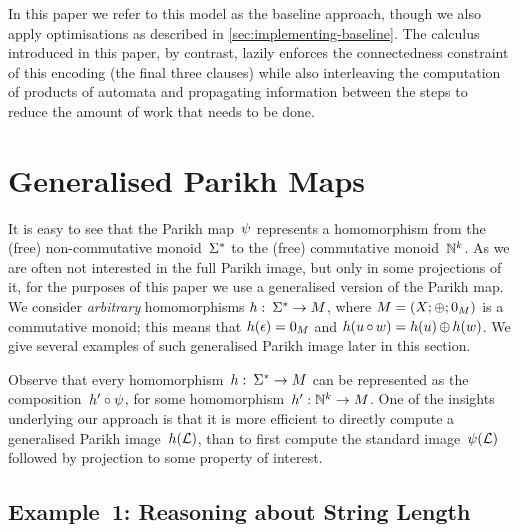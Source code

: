 \documentclass[acmsmall,review,anonymous,screen]{acmart}\settopmatter{printfolios=true,printccs=false,printacmref=true}
\theoremstyle{definition}
\begin{document}
In this paper we refer to this model as the baseline approach, though we also
apply optimisations as described in \cref{sec:implementing-baseline}. The
calculus introduced in this paper, by contrast, lazily enforces the
connectedness constraint of this encoding (the final three clauses) while also
interleaving the computation of products of automata and propagating information
between the steps to reduce the amount of work that needs to be done.
  
\section{Generalised Parikh Maps}\label{sec:generalised}

It is easy to see that the Parikh map~$\operatorname{\psi}$ represents a
homomorphism from the (free) non-commutative monoid~$\Sigma^*$ to the
(free) commutative monoid~$\mathbb{N}^k$. As we are often not
interested in the full Parikh image, but only in some projections of
it, for the purposes of this paper we use a generalised version of the
Parikh map. We consider \emph{arbitrary} homomorphisms
$h:\: \Sigma^* \to M$, where
$M = \left(X;\operatorname{\oplus};0_{M}\right)$ is a commutative
monoid; this means that $h(\epsilon) = 0_{M}$ and
$h(u \operatorname{\circ} w) = h(u) \operatorname{\oplus} h(w)$. We give several
examples of such generalised Parikh image later in this section.

Observe that every homomorphism~$h:\: \Sigma^* \to M$ can be
represented as the composition~$h' \circ \operatorname{\psi}$, for some
homomorphism~$h' : \mathbb{N}^k \to M$. One of the insights underlying our
approach is that it is more efficient to directly compute a
generalised Parikh image~$h(\operatorname{\mathcal{L}})$, than to first compute the
standard image~$\operatorname{\psi}(\operatorname{\mathcal{L}})$ followed by projection to
some property of interest.


\subsection{Example~1: Reasoning about String Length}
\end{document}
